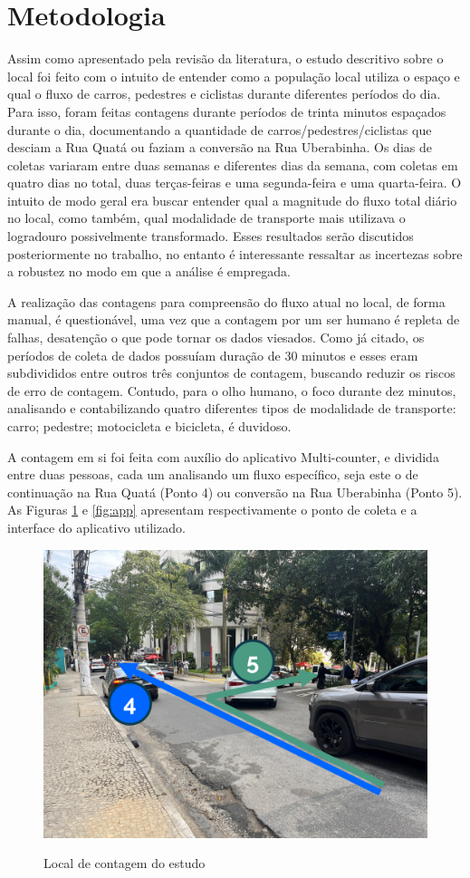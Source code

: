 \section{Metodologia}
Assim como apresentado pela revisão da literatura, o estudo descritivo sobre o local foi feito com o intuito de entender como a população local utiliza o espaço e qual o fluxo de carros, pedestres e ciclistas durante diferentes períodos do dia. Para isso, foram feitas contagens durante períodos de trinta minutos espaçados durante o dia, documentando a quantidade de carros/pedestres/ciclistas que desciam a Rua Quatá ou faziam a conversão na Rua Uberabinha. Os dias de coletas variaram entre duas semanas e diferentes dias da semana, com coletas em quatro dias no total, duas terças-feiras e uma segunda-feira e uma quarta-feira. O intuito de modo geral era buscar entender qual a magnitude do fluxo total diário no local, como também, qual modalidade de transporte mais utilizava o logradouro possivelmente transformado. Esses resultados serão discutidos posteriormente no trabalho, no entanto é interessante ressaltar as incertezas sobre a robustez no modo em que a análise é empregada. 

A realização das contagens para compreensão do fluxo atual no local, de forma manual, é questionável, uma vez que a contagem por um ser humano é repleta de falhas, desatenção o que pode tornar os dados viesados. Como já citado, os períodos de coleta de dados possuíam duração de 30 minutos e esses eram subdivididos entre outros três conjuntos de contagem, buscando reduzir os riscos de erro de contagem. Contudo, para o olho humano, o foco durante dez minutos, analisando e contabilizando quatro diferentes tipos de modalidade de transporte: carro; pedestre; motocicleta e bicicleta, é duvidoso.

A contagem em si foi feita com auxílio do aplicativo Multi-counter, e dividida entre duas pessoas, cada um analisando um fluxo específico, seja este o de continuação na Rua Quatá (Ponto 4) ou conversão na Rua Uberabinha (Ponto 5). As Figuras \ref{fig:rotas} e \ref{fig:app} apresentam respectivamente o ponto de coleta e a interface do aplicativo utilizado.

\begin{figure}[H]
    \centering
    \caption{Local de contagem do estudo}
    \includegraphics[width = 0.6\linewidth]{relatorios/uberabinha/figuras/rotas_analise.png}
    \label{fig:rotas}
\end{figure}

